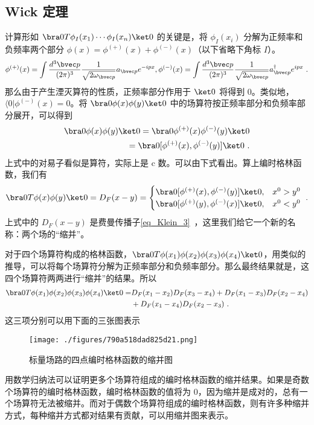 \subsection{Wick 定理}
计算形如 $\bra 0 T\phi_I(x_1)\cdots\phi_I(x_n) \ket 0$ 的关键是，将 $\phi_I(x_i)$ 分解为正频率和负频率两个部分 $\phi( x)=\phi^{(+)}( x)+\phi^{(-)}( x)$（以下省略下角标 $I$）。
\begin{equation}
\phi^{(+)}( x) = \int \frac{d{}^3{\bvec p}}{(2\pi)^3} \frac{1}{\sqrt{2\omega_{\bvec p}}}a_{\bvec p} e^{-ipx} ,
\phi^{(-)}( x) = \int \frac{d{}^3{\bvec p}}{(2\pi)^3} \frac{1}{\sqrt{2\omega_{\bvec p}}}a_{\bvec p}^\dagger e^{ipx} ~.
\end{equation}
那么由于产生湮灭算符的性质，正频率部分作用于 $\ket 0$ 将得到 $0$。类似地，$\langle 0| \phi^{(-)}( x)=0$。将 $\bra 0 \phi(x)\phi(y)\ket 0$ 中的场算符按正频率部分和负频率部分展开，可以得到
\begin{equation}
\begin{aligned}
\bra 0 \phi( x)\phi( y)\ket 0=\bra 0 \phi^{(+)}( x)\phi^{(-)}( y)\ket 0\\
 = \bra 0[\phi^{(+)}( x),\phi^{(-)}( y)]\ket 0~.
\end{aligned}
\end{equation}
上式中的对易子看似是算符，实际上是 c 数。可以由下式看出。算上编时格林函数，我们有
\begin{equation}
\bra 0 T\phi( x)\phi( y)\ket 0=D_F(x-y)=\begin{cases}
\bra 0[\phi^{(+)}( x),\phi^{(-)}( y)]\ket 0, &x^0>y^0\\
\bra 0[\phi^{(+)}( y),\phi^{(-)}( x)]\ket 0, &x^0<y^0
\end{cases}~.
\end{equation}
上式中的 $D_F(x-y)$ 是费曼传播子\autoref{eq_Klein_3}~，这里我们给它一个新的名称：两个场的“缩并”。

对于四个场算符构成的格林函数，$\bra 0 T\phi(x_1)\phi(x_2)\phi(x_3)\phi(x_4)\ket 0$，用类似的推导，可以将每个场算符分解为正频率部分和负频率部分。那么最终结果就是，这四个场算符两两进行“缩并”的结果。所以
\begin{equation}
\begin{aligned}
\bra 0 T\phi(x_1)\phi(x_2)\phi(x_3)\phi(x_4)\ket 0=&D_F(x_1-x_2)D_F(x_3-x_4)+D_F(x_1-x_3)D_F(x_2-x_4)
\\&+D_F(x_1-x_4)D_F(x_2-x_3)~.
\end{aligned}
\end{equation}
这三项分别可以用下面的三张图表示
\begin{figure}[ht]
\centering
\texttt{[image: ./figures/790a518dad825d21.png]}
\caption{标量场路的四点编时格林函数的缩并图} \label{fig_wick_1}
\end{figure}

用数学归纳法可以证明更多个场算符组成的编时格林函数的缩并结果。如果是奇数个场算符的编时格林函数，编时格林函数的值将为 $0$，因为缩并是成对的，总有一个场算符无法被缩并。而对于偶数个场算符组成的编时格林函数，则有许多种缩并方式，每种缩并方式都对结果有贡献，可以用缩并图来表示。